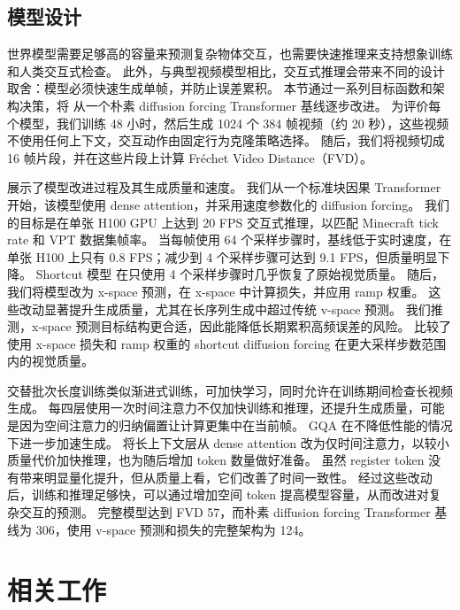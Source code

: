 \documentclass[11pt]{article}
\begin{document}
\subsection{模型设计}
\label{sec:modeldesign}



世界模型需要足够高的容量来预测复杂物体交互，也需要快速推理来支持想象训练和人类交互式检查。
此外，与典型视频模型相比，交互式推理会带来不同的设计取舍：模型必须快速生成单帧，并防止误差累积。
本节通过一系列目标函数和架构决策，将 \method 从一个朴素 diffusion forcing Transformer 基线逐步改进。
为评价每个模型，我们训练 48 小时，然后生成 1024 个 384 帧视频（约 20 秒），这些视频不使用任何上下文，交互动作由固定行为克隆策略选择。
随后，我们将视频切成 16 帧片段，并在这些片段上计算 Fréchet Video Distance（FVD）\citep{fvd}。

\pagebreak
%
 展示了模型改进过程及其生成质量和速度。
我们从一个标准块因果 Transformer 开始，该模型使用 dense attention，并采用速度参数化的 diffusion forcing。
我们的目标是在单张 H100 GPU 上达到 20 FPS 交互式推理，以匹配 Minecraft tick rate 和 VPT 数据集帧率。
当每帧使用 64 个采样步骤时，基线低于实时速度，在单张 H100 上只有 0.8 FPS；减少到 4 个采样步骤可达到 9.1 FPS，但质量明显下降。
Shortcut 模型\citep{shortcut} 在只使用 4 个采样步骤时几乎恢复了原始视觉质量。
随后，我们将模型改为 x-space 预测，在 x-space 中计算损失，并应用 ramp 权重。
这些改动显著提升生成质量，尤其在长序列生成中超过传统 v-space 预测。
我们推测，x-space 预测目标结构更合适，因此能降低长期累积高频误差的风险。
 比较了使用 x-space 损失和 ramp 权重的 shortcut diffusion forcing 在更大采样步数范围内的视觉质量。

交替批次长度训练类似渐进式训练，可加快学习，同时允许在训练期间检查长视频生成。
每四层使用一次时间注意力不仅加快训练和推理\citep{llama4}，还提升生成质量，可能是因为空间注意力的归纳偏置让计算更集中在当前帧。
GQA 在不降低性能的情况下进一步加速生成。
将长上下文层从 dense attention 改为仅时间注意力，以较小质量代价加快推理，也为随后增加 token 数量做好准备。
虽然 register token 没有带来明显量化提升，但从质量上看，它们改善了时间一致性。
经过这些改动后，训练和推理足够快，可以通过增加空间 token 提高模型容量，从而改进对复杂交互的预测。
完整模型达到 FVD 57，而朴素 diffusion forcing Transformer 基线为 306，使用 v-space 预测和损失的完整架构为 124。



\pagebreak
\section{相关工作}
\end{document}
